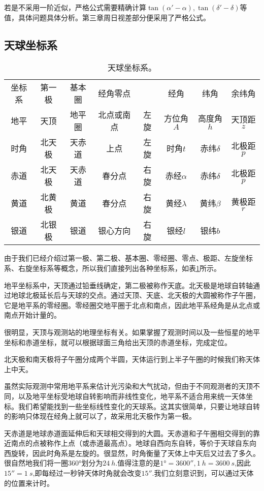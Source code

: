 \documentclass[11pt, a4paper, oneside]{ctexart}
\numberwithin{equation}{subsection}
\begin{document}
若是不采用一阶近似，严格公式需要精确计算$\tan\left(\alpha'-\alpha\right),\tan\left(\delta{}'-\delta{}\right)$等值，具体问题具体分析。第三章周日视差部分便采用了严格公式。

\subsection{天球坐标系}
\begin{table}[htbp]
\centering
\caption{天球坐标系。}
\begin{tabular}{c c c c c c c c}
\hline
坐标系 & 第一极 & 基本圈 & 经角零点 &  & 经角 & 纬角 & 余纬角\\
\cline{1-8}
地平 & 天顶 & 地平圈 & 北点或南点 & 左旋 & 方位角$A$ & 高度角$h$ & 天顶距$z$\\
\cline{1-8}
时角 & 北天极 & 天赤道 & 上点 & 左旋 & 时角$t$ & 赤纬$\delta{}$ & 北极距$p$\\
\cline{1-8}
赤道 & 北天极 & 天赤道 & 春分点 & 右旋 & 赤经$\alpha$ & 赤纬$\delta{}$ & 北极距$p$\\
\cline{1-8}
黄道 & 北黄极 & 黄道 & 春分点 & 右旋 & 黄经$\lambda$ & 黄纬$\beta$ & 黄极距$r$\\
\cline{1-8}
银道 & 北银极 & 银道 & 银心方向 & 右旋 & 银经$l$ & 银纬$b$ & \\
\cline{1-8}
\end{tabular}
\label{天球坐标系。}
\end{table}

由于我们已经介绍过第一极、第二极、基本圈、零经圈、零点、极距、左旋坐标系、右旋坐标系等概念，所以我们直接列出各种坐标系，如表\ref{天球坐标系。}所示。

地平坐标系中，天顶通过铅垂线确定，第二极被称作天底。北天极是地球自转轴通过地球北极延长后与天球的交点。通过天顶、天底、北天极的大圆被称作子午圈，它是地平系的零经圈。零经圈交地平圈于北点和南点，因此地平系经角是从北点或南点开始计量的。

很明显，天顶与观测站的地理坐标有关。如果掌握了观测时间以及一些恒星的地平坐标和赤道坐标，就可以根据球面三角给出天顶的赤道坐标，完成定位。

\newpage
北天极和南天极将子午圈分成两个半圆，天体运行到上半子午圈的时候我们称天体上中天。

虽然实际观测中常用地平系来估计光污染和大气扰动，但由于不同观测者的天顶不同，以及地平坐标受地球自转影响而非线性变化，地平系不适合用来统一天体坐标。我们希望能找到一些坐标线性变化的天球系。这其实很简单，只要让地球自转的影响只体现在经角上就可以了，故采用北天极作为第一极。

天赤道是地球赤道面延伸后和天球相交得到的大圆。天赤道和子午圈相交得到的靠近南点的点被称作上点（或赤道最高点）。地球自西向东自转，等价于天球自东向西旋转，因此时角系是左旋的。很显然，时角衡量了天体上中天后又过去了多久。很自然地我们将一圈$\ang{360;;}$划分为$\qty{24}{h}$.值得注意的是$\ang{1;;}=\ang{;;3600},\qty{1}{h}=\qty{3600}{s}$,因此$\ang{;;15}=\qty{1}{s}$,即每经过一秒钟天体时角就会改变$\ang{;;15}$.我们立刻意识到，可以通过天体的位置来计时。
\end{document}

